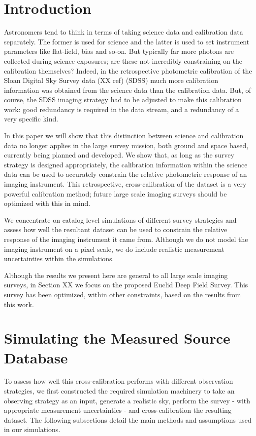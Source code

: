 \documentclass[manuscript]{aastex}
\begin{document}
\section{Introduction}
Astronomers tend to think in terms of taking science data and calibration data separately. The former is used for science and the latter is used to set instrument parameters like flat-field, bias and so-on. But typically far more photons are collected during science exposures; are these not incredibly constraining on the calibration themselves? Indeed, in the retrospective photometric calibration of the Sloan Digital Sky Survey data (XX ref) (SDSS) much more calibration information was obtained from the science data than the calibration data. But, of course, the SDSS imaging strategy had to be adjusted to make this calibration work: good redundancy is required in the data stream, and a redundancy of a very specific kind.

In this paper we will show that this distinction between science and calibration data no longer applies in the large survey mission, both ground and space based, currently being planned and developed. We show that, as long as the survey strategy is designed appropriately, the calibration information within the science data can be used to accurately constrain the relative photometric response of an imaging instrument. This retrospective, cross-calibration of the dataset is a very powerful calibration method; future large scale imaging surveys should be optimized with this in mind. 

We concentrate on catalog level simulations of different survey strategies and assess how well the resultant dataset can be used to constrain the relative response of the imaging instrument it came from. Although we do not model the imaging instrument on a pixel scale, we do include realistic measurement uncertainties within the simulations. 

Although the results we present here are general to all large scale imaging surveys, in Section XX we focus on the proposed Euclid Deep Field Survey. This survey has been optimized, within other constraints, based on the results from this work. 

\section{Simulating the Measured Source Database}
To assess how well this cross-calibration performs with different observation strategies, we first constructed the required simulation machinery to take an observing strategy as an input, generate a realistic sky, perform the survey - with appropriate measurement uncertainties - and cross-calibration the resulting dataset. The following subsections detail the main methods and assumptions used in our simulations.  
\end{document}
